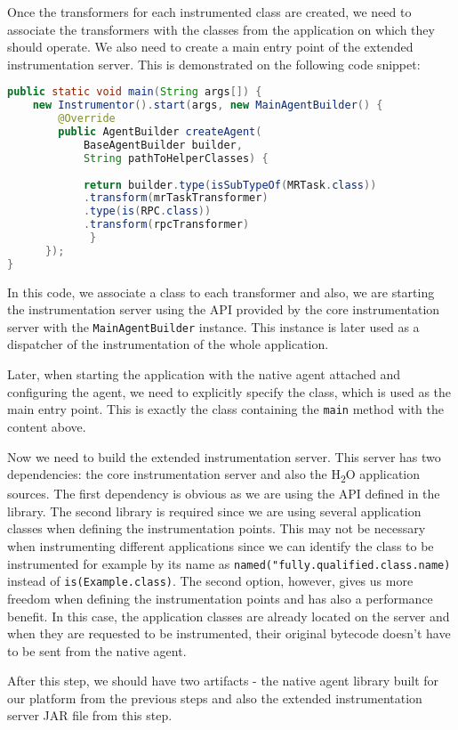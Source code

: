 Once the transformers for each instrumented class are created, we need to associate the transformers with the classes from the application on which they should operate. We also need to create a main entry point of the extended instrumentation server. This is demonstrated on the following code snippet:

\begin{lstlisting}[language=Java]
 public static void main(String args[]) {
	new Instrumentor().start(args, new MainAgentBuilder() {
		@Override
		public AgentBuilder createAgent(
			BaseAgentBuilder builder,
			String pathToHelperClasses) {
	 		 
			return builder.type(isSubTypeOf(MRTask.class))
			.transform(mrTaskTransformer)
			.type(is(RPC.class))
			.transform(rpcTransformer)
	         }
	  });
}			 
\end{lstlisting}
In this code, we associate a class to each transformer and also, we are starting the instrumentation server using the API provided by the core instrumentation server with the \texttt{MainAgentBuilder} instance. This instance is later used as a dispatcher of the instrumentation of the whole application.

Later, when starting the application with the native agent attached and configuring the agent, we need to explicitly specify the class, which is used as the main entry point. This is exactly the class containing the \texttt{main} method with the content above.

Now we need to build the extended instrumentation server. This server has two dependencies: the core instrumentation server and also the H\textsubscript{2}O application sources. The first dependency is obvious as we are using the API defined in the library. The second library is required since we are using several application classes when defining the instrumentation points. This may not be necessary when instrumenting different applications since we can identify the class to be instrumented for example by its name as \texttt{named("fully.qualified.class.name)} instead of \texttt{is(Example.class)}. The second option, however, gives us more freedom when defining the instrumentation points and has also a performance benefit. In this case, the application classes are already located on the server and when they are requested to be instrumented, their original bytecode doesn't have to be sent from the native agent. 

After this step, we should have two artifacts - the native agent library built for our platform from the previous steps and also the extended instrumentation server JAR file from this step.
